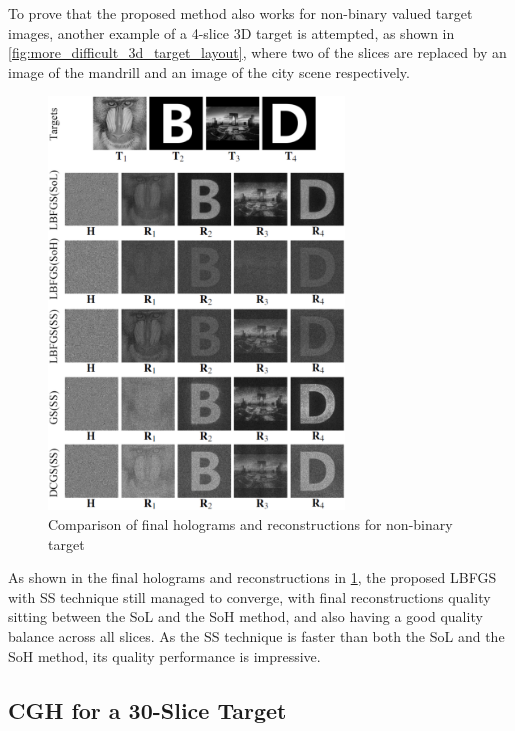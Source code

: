 To prove that the proposed method also works for non-binary valued target images, another example of a 4-slice 3D target is attempted, as shown in \cref{fig:more_difficult_3d_target_layout}, where two of the slices are replaced by an image of the mandrill \cite{MANDRILL_REF} and an image of the city scene \cite{Zhang2017} respectively.

\begin{figure}[H]
	\centering
	\includegraphics[width=0.7\textwidth]{final_holograms_reconstructions_4_slice_non_binary}
	\caption{Comparison of final holograms and reconstructions for non-binary target}
	\label{fig:more_difficult_3d_target_recon}
\end{figure}

As shown in the final holograms and reconstructions in \cref{fig:more_difficult_3d_target_recon}, the proposed LBFGS with SS technique still managed to converge, with final reconstructions quality sitting between the SoL and the SoH method, and also having a good quality balance across all slices. As the SS technique is faster than both the SoL and the SoH method, its quality performance is impressive.



\newpage
\subsection{CGH for a 30-Slice Target} \label{sec:30-slice-target}


